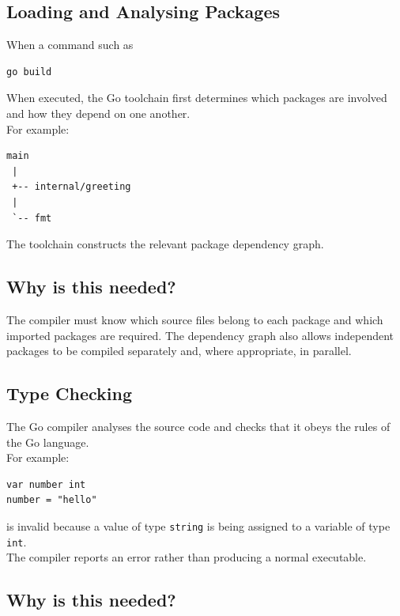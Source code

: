 \subsection{Loading and Analysing Packages}

When a command such as

\begin{lstlisting}
go build
\end{lstlisting}

When executed, the Go toolchain first determines which packages are
involved and how they depend on one another.\\

For example:

\begin{lstlisting}
main
 |
 +-- internal/greeting
 |
 `-- fmt
\end{lstlisting}

The toolchain constructs the relevant package dependency graph.

\subsection*{Why is this needed?}

The compiler must know which source files belong to each package and
which imported packages are required.  The dependency graph also
allows independent packages to be compiled separately and, where
appropriate, in parallel.

\subsection{Type Checking}

The Go compiler analyses the source code and checks that it obeys the
rules of the Go language.\\

For example:

\begin{lstlisting}
var number int
number = "hello"
\end{lstlisting}

is invalid because a value of type \texttt{string} is being assigned to
a variable of type \texttt{int}.\\

The compiler reports an error rather than producing a normal executable.

\subsection*{Why is this needed?}

